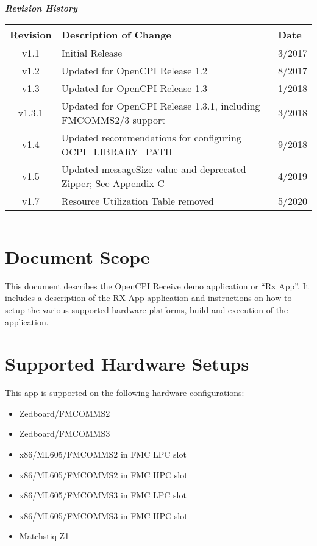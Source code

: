 	\begin{center}
	\textit{\textbf{Revision History}}
		\begin{table}[H]
		\label{table:revisions} %
			\begin{tabularx}{\textwidth}{|c|X|l|}
			\hline
			\rowcolor{blue}
			\textbf{Revision} & \textbf{Description of Change} & \textbf{Date} \\
		    \hline
		    v1.1 & Initial Release & 3/2017 \\
		    \hline
		    v1.2 & Updated for OpenCPI Release 1.2 & 8/2017 \\
			\hline
			v1.3 & Updated for OpenCPI Release 1.3 & 1/2018 \\
			\hline
			v1.3.1 & Updated for OpenCPI Release 1.3.1, including FMCOMMS2/3 support & 3/2018 \\
			\hline
			v1.4 & Updated recommendations for configuring OCPI\_LIBRARY\_PATH & 9/2018 \\
			\hline
			v1.5 & Updated messageSize value and deprecated Zipper; See Appendix C & 4/2019 \\
			\hline
			v1.7 & Resource Utilization Table removed & 5/2020 \\
			\hline
			\end{tabularx}
		\end{table}
	\end{center}

\newpage
\tableofcontents
\pagebreak
\vspace{1pc}
\hrule
\section{Document Scope}
This document describes the OpenCPI Receive demo application or ``Rx App''. It includes a description of the RX App application and instructions on how to setup the various supported hardware platforms, build and execution of the application.

\section{Supported Hardware Setups}
This app is supported on the following hardware configurations:
\begin{itemize}
  \item Zedboard/FMCOMMS2
  \item Zedboard/FMCOMMS3
  \item x86/ML605/FMCOMMS2 in FMC LPC slot
  \item x86/ML605/FMCOMMS2 in FMC HPC slot
  \item x86/ML605/FMCOMMS3 in FMC LPC slot
  \item x86/ML605/FMCOMMS3 in FMC HPC slot
  \item Matchstiq-Z1
\end{itemize}


